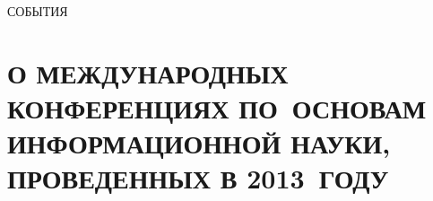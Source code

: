 \def\stat{rekl-1}

   
   \begin{center}

{\prgsh\LARGE СОБЫТИЯ}

\end{center}



   \thispagestyle{empty}
   
   \vspace*{6mm}
   
   \section*{О МЕЖДУНАРОДНЫХ КОНФЕРЕНЦИЯХ ПО~ОСНОВАМ ИНФОРМАЦИОННОЙ НАУКИ, 
ПРОВЕДЕННЫХ В 2013~ГОДУ}

\vspace*{6pt}
   
